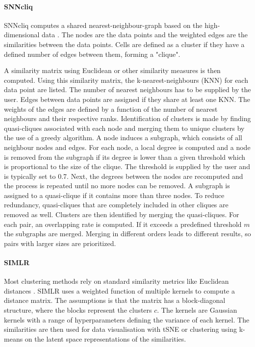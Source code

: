 \documentclass[11pt, a4paper]{article}\usepackage[]{graphicx}\usepackage[]{color}
\begin{document}
\paragraph{SNNcliq}
SNNcliq computes a shared nearest-neighbour-graph based on the high-dimensional data \citep{xu2015identification}. The nodes are the data points and the weighted edges are the similarities between the data points. Cells are defined as a cluster if they have a defined number of edges between them, forming a "clique". 

A similarity matrix using Euclidean or other similarity measures is then computed. Using this similarity matrix, the k-nearest-neighbours (KNN) for each data point are listed. The number of nearest neighbours has to be supplied by the user. Edges between data points are assigned if they share at least one KNN. The weights of the edges are defined by a function of the number of nearest neighbours and their respective ranks. 
Identification of clusters is made by finding quasi-cliques associated with each node and merging them to unique clusters by the use of a greedy algorithm. A node induces a subgraph, which consists of all neighbour nodes and edges. For each node, a local degree is computed and a node is removed from the subgraph if its degree is lower than a given threshold which is proportional to the size of the clique. The threshold is supplied by the user and is typically set to 0.7. Next, the degrees between the nodes are recomputed and the process is repeated until no more nodes can be removed. A subgraph is assigned to a quasi-clique if it contains more than three nodes. To reduce redundancy, quasi-cliques that are completely included in other cliques are removed as well.
Clusters are then identified by merging the quasi-cliques. For each pair, an overlapping rate is computed. If it exceeds a predefined threshold $m$ the subgraphs are merged. Merging in different orders leads to different results, so pairs with larger sizes are prioritized.
\paragraph{SIMLR}
Most clustering methods rely on standard similarity metrics like Euclidean distances \citep{wang2017visualization}. SIMLR uses a weighted function of multiple kernels to compute a distance matrix. The assumptions is that the matrix has a block-diagonal structure, where the blocks represent the clusters $c$. The kernels are Gaussian kernels with a range of hyperparameters defining the variance of each kernel. The similarities are then used for data visualisation with tSNE or clustering using k-means on the latent space representations of the similarities.
\end{document}

